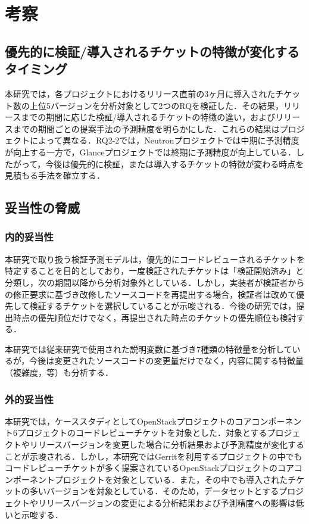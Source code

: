 \documentclass[T,J]{fose} %
\begin{document}
\section{考察}\label{sec:disc}

\subsection{優先的に検証/導入されるチケットの特徴が変化するタイミング}\label{secsec:glance_review}
本研究では，各プロジェクトにおけるリリース直前の3ヶ月に導入されたチケット数の上位5バージョンを分析対象として2つのRQを検証した．その結果，リリースまでの期間に応じた検証/導入されるチケットの特徴の違い，およびリリースまでの期間ごとの提案手法の予測精度を明らかにした．これらの結果はプロジェクトによって異なる．RQ2-2では，Neutronプロジェクトでは中期に予測精度が向上する一方で，Glanceプロジェクトでは終期に予測精度が向上している．したがって，今後は優先的に検証，または導入するチケットの特徴が変わる時点を見積もる手法を確立する．

\subsection{妥当性の脅威}
\subsubsection{内的妥当性}
本研究で取り扱う検証予測モデルは，優先的にコードレビューされるチケットを特定することを目的としており，一度検証されたチケットは「検証開始済み」と分類し，次の期間以降から分析対象外としている．しかし，実装者が検証者からの修正要求に基づき改修したソースコードを再提出する場合，検証者は改めて優先して検証するチケットを選択していることが示唆される．今後の研究では，提出時点の優先順位だけでなく，再提出された時点のチケットの優先順位も検討する．

本研究では従来研究で使用された説明変数に基づき7種類の特徴量を分析しているが，今後は変更されたソースコードの変更量だけでなく，内容に関する特徴量（複雑度，等）も分析する．

\subsubsection{外的妥当性}
本研究では，ケーススタディとしてOpenStackプロジェクトのコアコンポーネント6プロジェクトのコードレビューチケットを対象とした．対象とするプロジェクトやリリースバージョンを変更した場合に分析結果および予測精度が変化することが示唆される．しかし，本研究ではGerritを利用するプロジェクトの中でもコードレビューチケットが多く提案されているOpenStackプロジェクトのコアコンポーネントプロジェクトを対象としている．また，その中でも導入されたチケットの多いバージョンを対象としている．そのため，データセットとするプロジェクトやリリースバージョンの変更による分析結果および予測精度への影響は低いと示唆する．
\end{document}
